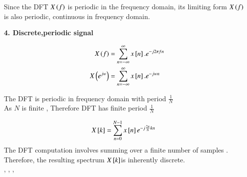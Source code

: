 \documentclass[journal,12pt,onecolumn]{IEEEtran}
\theoremstyle{remark}
\begin{document}
Since the DFT $X\left(f\right)$  is periodic in the frequency domain, its limiting form $X\left(f\right)$ is also periodic, continuous in frequency domain.

\vspace{2mm}
\textbf{4. Discrete,periodic signal}

\begin{align}
X\left(f\right)&= \sum_{n=-\infty}^{\infty} x{}\left[n\right].e^{-j2\pi fn}\\
X\left(e^{jw}\right)&= \sum_{n=-\infty}^{\infty} x{}\left[n\right].e^{-jwn}
\end{align}

The DFT is periodic in frequency domain with period $\frac{1}{N}$\\

As $N$ is finite , Therefore DFT has finite period $\frac{1}{N}$

\begin{align}
X{}\left[k\right]&=\sum_{n=0}^{N-1}x{}\left[n\right]e^{-j\frac{2\pi}{N}kn}
\end{align}
The DFT computation involves summing over a finite number of samples . Therefore, the resulting spectrum  $X{}\left[k\right]$is inherently discrete.\\

 \textrightarrow {}   ,   \textrightarrow {}   ,    \textrightarrow {}   ,    \textrightarrow {}
\end{document}
